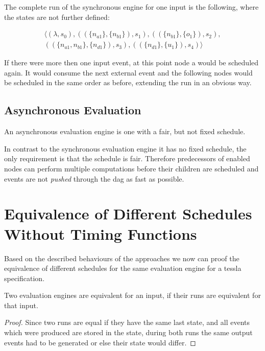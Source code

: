 The complete run of the synchronous engine for one input is the following, where the states are not further defined:

\begin{align*}
  \langle
    (\lambda,                             s_0),
    ((\{ n_{a1}         \}, \{n_{b1}\}),  s_1),
    ((\{ n_{b1}         \}, \{o_1\}),     s_2),\\
    ((\{ n_{a1}, n_{b1} \}, \{n_{d1}\}),  s_3),
    ((\{ n_{d1}         \}, \{u_1\}),     s_4)
  \rangle
\end{align*}

If there were more then one input event, at this point node a would be scheduled again.
It would consume the next external event and the following nodes would be scheduled in the same order as before, extending the run in an obvious way.

\subsection{Asynchronous Evaluation}
\label{sec:concepts:behaviour_without_timing:async}

An asynchronous evaluation engine is one with a fair, but not fixed schedule.

In contrast to the synchronous evaluation engine it has no fixed schedule, the only requirement is that the schedule is fair.
Therefore predecessors of enabled nodes can perform multiple computations before their children are scheduled and events are not \emph{pushed} through the \gls{dag} as fast as possible.

\section{Equivalence of Different Schedules Without Timing Functions}
\label{sec:concepts:equivalence_without_timing}

Based on the described behaviours of the approaches we now can proof the equivalence of different schedules for the same evaluation engine for a \gls{tessla} specification.

\begin{lemma}[name = Equivalence of Engines for one Input]\label{lemma:eval_equivalent_if_runs_equal}
  Two evaluation engines are equivalent for an input, if their runs are equivalent for that input.
\end{lemma}

\begin{proof}
  Since two runs are equal if they have the same last state, and all events which were produced are stored in the state, during both runs the same output events had to be generated or else their state would differ.
\end{proof}

